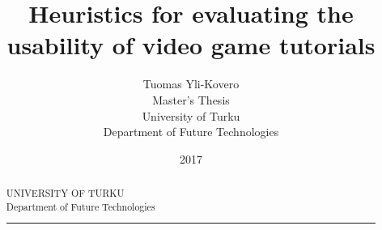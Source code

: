 \documentclass[12pt, a4paper]{report}
\title{Heuristics for evaluating the usability of video game tutorials}
\date{2017}
\author{Tuomas Yli-Kovero\\
  \small{Master's Thesis}\\
  \small{University of Turku}\\
  \small{Department of Future Technologies}}
\begin{document}
\maketitle

\begin{abstract}
  UNIVERSITY OF TURKU\\
  Department of Future Technologies
\hrule
\end{abstract}

\tableofcontents












\end{document}
